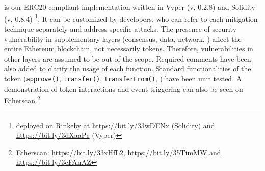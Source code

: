 

\section{\sys}\label{sec:proposal}
\sys is our ERC20-compliant implementation written in Vyper (v. 0.2.8) and Solidity (v. 0.8.4) \footnote{\sys deployed on Rinkeby at \url{https://bit.ly/33wDENx} (Solidity) and \url{https://bit.ly/3dXaaPc} (Vyper)}. It can be customized by developers, who can refer to each mitigation technique separately and address specific attacks. The presence of security vulnerability in supplementary layers (\ie consensus, data, network. \etc) affect the entire Ethereum blockchain, not necessarily \erc tokens. Therefore, vulnerabilities in other layers are assumed to be out of the scope. Required comments have been also added to clarify the usage of each function. Standard functionalities of the token (\ie \texttt{approve()}, \texttt{transfer()}, \texttt{transferFrom()}, \etc) have been unit tested. A demonstration of token interactions and event triggering can also be seen on Etherscan.\footnote{Etherscan: \url{https://bit.ly/33xHfL2}, \url{https://bit.ly/35TimMW} and \url{https://bit.ly/3eFAnAZ}}



